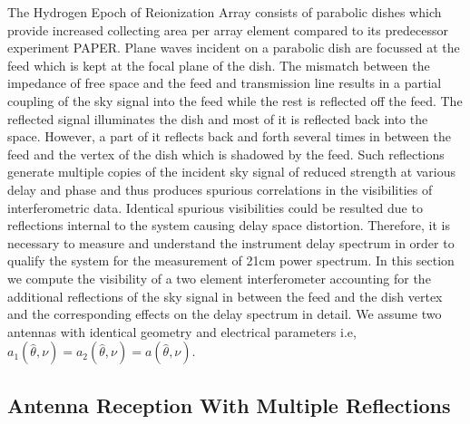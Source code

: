 \documentclass[twocolumn]{emulateapj}
\newcommand{\bmvolt}{{a}}
\newcommand{\thhat}{{\hat\theta}}
\begin{document}
    The Hydrogen Epoch of Reionization Array consists of parabolic dishes which
    provide increased collecting area per array element compared to its predecessor
    experiment PAPER. Plane waves incident on a parabolic dish are focussed at the
    feed which is kept at the focal plane of the dish.  The mismatch between the
    impedance of free space and the feed and transmission line results in a partial
    coupling of the sky signal into the feed while the rest is reflected off the
    feed.  The reflected signal illuminates the dish and most of it is reflected
    back into the space.  However, a part of it reflects back and forth several
    times in between the feed and the vertex of the dish which is shadowed by the
    feed.  Such reflections generate multiple copies of the incident sky signal of
    reduced strength at various delay and phase and thus produces spurious
    correlations in the visibilities of interferometric data.  Identical spurious
    visibilities could be resulted due to reflections internal to the system
    causing delay space distortion. Therefore, it is necessary to measure and
    understand the instrument delay spectrum in order to qualify the system for the
    measurement of 21cm power spectrum.  In this section we compute the visibility
    of a two element interferometer accounting for the additional reflections of
    the sky signal in between the feed and the dish vertex and the corresponding
    effects on the delay spectrum in detail. We assume two antennas with identical
    geometry and electrical parameters i.e,
    $\bmvolt_{1}(\thhat,\nu)=\bmvolt_{2}(\thhat,\nu) = \bmvolt(\thhat,\nu)$. 
    
     \subsection{Antenna Reception With Multiple Reflections}
    \label{sec:multiple}
    
\end{document}
